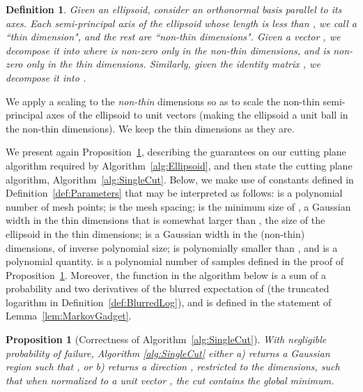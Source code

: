 \documentclass[11pt,letter]{article}
\newcounter{nTheorems}
\numberwithin{nTheorems}{section}
\newtheorem{proposition}[nTheorems]{Proposition}
\newtheorem{definition}[nTheorems]{Definition}
\begin{document}
\begin{definition}
\label{def:TopBottom}
  Given an ellipsoid, consider an orthonormal basis parallel to its axes. Each semi-principal axis of the ellipsoid whose length is less than , we call a ``thin dimension", and the rest are ``non-thin dimensions".
  Given a vector , we decompose it into  where  is non-zero only in the non-thin dimensions, and  is non-zero only in the thin dimensions.
Similarly, given the identity matrix , we decompose it into .
\end{definition}
We apply a scaling to the \emph{non-thin} dimensions so as to scale the non-thin semi-principal axes of the ellipsoid to unit vectors (making the ellipsoid a unit ball in the non-thin dimensions).
We keep the thin dimensions as they are.


We present again Proposition~\ref{prop:Alg1Correctness}, describing the guarantees on our cutting plane algorithm required by Algorithm~\ref{alg:Ellipsoid}, and then state the cutting plane algorithm, Algorithm~\ref{alg:SingleCut}.
Below, we make use of constants defined in Definition~\ref{def:Parameters}  that may be interpreted as follows:  is a polynomial number of mesh points;   is the mesh spacing;  is the minimum size of , a Gaussian width in the thin dimensions that is somewhat larger than , the size of the ellipsoid in the thin dimensions;  is a Gaussian width in the  (non-thin) dimensions, of inverse polynomial size;  is polynomially smaller than , and  is a polynomial quantity.  is a polynomial number of samples defined in the proof of Proposition~\ref{prop:Alg1Correctness}.
Moreover, the function  in the algorithm below is a sum of a probability and two derivatives of the blurred expectation of  (the truncated logarithm in Definition~\ref{def:BlurredLog}), and is defined in the statement of Lemma~\ref{lem:MarkovGadget}.


\begin{proposition}[Correctness of Algorithm~\ref{alg:SingleCut}]
\label{prop:Alg1Correctness}
With negligible probability of failure, Algorithm \ref{alg:SingleCut} either a) returns a Gaussian region  such that , or b) returns a direction , restricted to the  dimensions, such that when normalized to a unit vector , the cut  contains the global minimum.
\end{proposition}
\end{document}
